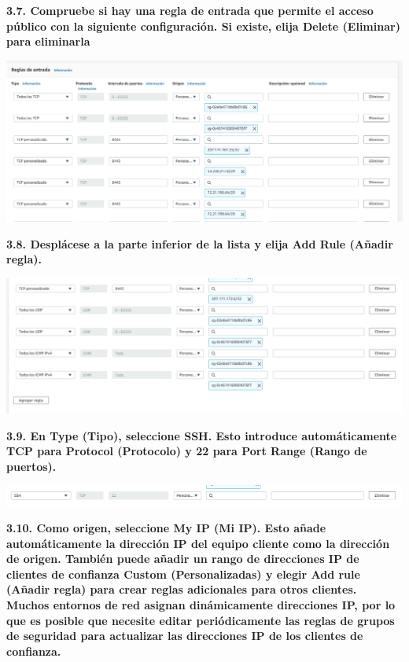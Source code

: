 \documentclass{article}
\begin{document}
\newpage
\textbf{3.7. Compruebe si hay una regla de entrada que permite el acceso público con la siguiente configuración. Si
existe, elija Delete (Eliminar) para eliminarla
}

    \begin{center}
		\includegraphics[width=15cm]{./images/16} 
	\end{center}



\textbf{3.8. Desplácese a la parte inferior de la lista y elija Add Rule (Añadir regla). 
}

    \begin{center}
		\includegraphics[width=15cm]{./images/17} 
	\end{center}

\newpage
\textbf{3.9. En Type (Tipo), seleccione SSH. Esto introduce automáticamente TCP para Protocol (Protocolo) y 22
para Port Range (Rango de puertos). 
}

    \begin{center}
		\includegraphics[width=15cm]{./images/18} 
	\end{center}

\textbf{3.10. Como origen, seleccione My IP (Mi IP). Esto añade automáticamente la dirección IP del equipo cliente
como la dirección de origen. También puede añadir un rango de direcciones IP de clientes de confianza
Custom (Personalizadas) y elegir Add rule (Añadir regla) para crear reglas adicionales para otros
clientes. Muchos entornos de red asignan dinámicamente direcciones IP, por lo que es posible que 
necesite editar periódicamente las reglas de grupos de seguridad para actualizar las direcciones IP de
los clientes de confianza. 
}
\end{document}
